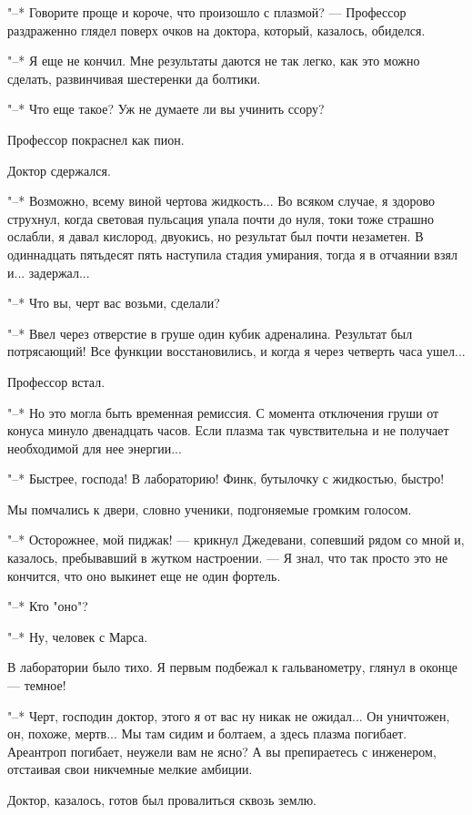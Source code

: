"--* Говорите проще  и  короче,  что  произошло  с  плазмой?  ---  Профессор
раздраженно глядел поверх очков на доктора, который, казалось, обиделся.

"--* Я еще не кончил. Мне результаты даются не так легко,  как  это  можно
сделать, развинчивая шестеренки да болтики.

"--* Что еще такое? Уж не думаете ли вы учинить ссору?

Профессор покраснел как пион.

Доктор сдержался.

"--* Возможно, всему виной чертова жидкость... Во всяком случае, я здорово
струхнул, когда световая пульсация упала почти до нуля, токи тоже  страшно
ослабли, я давал кислород, двуокись, но результат был почти  незаметен.  В
одиннадцать пятьдесят пять наступила стадия умирания, тогда я  в  отчаянии
взял и... задержал...

"--* Что вы, черт вас возьми, сделали?

"--* Ввел через отверстие в груше один  кубик  адреналина.  Результат  был
потрясающий! Все функции восстановились, и когда  я  через  четверть  часа
ушел...

Профессор встал.

"--* Но это могла быть временная ремиссия. С момента отключения  груши  от
конуса минуло  двенадцать  часов.  Если  плазма  так  чувствительна  и  не
получает необходимой для нее энергии...

"--* Быстрее, господа! В лабораторию! Финк, бутылочку с жидкостью, быстро!

Мы помчались к двери, словно ученики, подгоняемые громким голосом.

"--* Осторожнее, мой пиджак! --- крикнул Джедевани, сопевший рядом  со  мной
и, казалось, пребывавший в жутком настроении. --- Я знал, что так просто это
не кончится, что оно выкинет еще не один фортель.

"--* Кто "оно"?

"--* Ну, человек с Марса.

В лаборатории было тихо. Я первым подбежал к  гальванометру,  глянул  в
оконце --- темное!

"--* Черт, господин доктор, этого я  от  вас  ну  никак  не  ожидал...  Он
уничтожен, он, похоже, мертв... Мы там сидим и  болтаем,  а  здесь  плазма
погибает. Ареантроп погибает, неужели вам не ясно?  А  вы  препираетесь  с
инженером, отстаивая свои никчемные мелкие амбиции.

Доктор, казалось, готов был провалиться сквозь землю.

